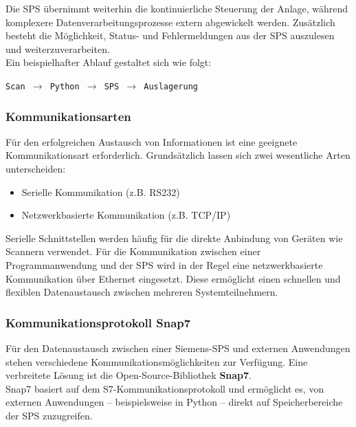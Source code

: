 Die SPS übernimmt weiterhin die kontinuierliche Steuerung der Anlage, während komplexere Datenverarbeitungsprozesse extern abgewickelt werden. Zusätzlich besteht die Möglichkeit, Status- und Fehlermeldungen aus der SPS auszulesen und weiterzuverarbeiten.\\

Ein beispielhafter Ablauf gestaltet sich wie folgt:

\begin{center}
	\texttt{Scan $\rightarrow$ Python $\rightarrow$ SPS $\rightarrow$ Auslagerung}
\end{center}

\subsubsection{Kommunikationsarten}

Für den erfolgreichen Austausch von Informationen ist eine geeignete Kommunikationsart erforderlich. Grundsätzlich lassen sich zwei wesentliche Arten unterscheiden:

\begin{itemize}
	\item Serielle Kommunikation (z.B. RS232)
	\item Netzwerkbasierte Kommunikation (z.B. TCP/IP)
\end{itemize}

Serielle Schnittstellen werden häufig für die direkte Anbindung von Geräten wie Scannern verwendet. Für die Kommunikation zwischen einer Programmanwendung und der SPS wird in der Regel eine netzwerkbasierte Kommunikation über Ethernet eingesetzt. Diese ermöglicht einen schnellen und flexiblen Datenaustausch zwischen mehreren Systemteilnehmern\cite{TCP}.

\subsubsection{Kommunikationsprotokoll Snap7}

Für den Datenaustausch zwischen einer Siemens-SPS und externen Anwendungen stehen verschiedene Kommunikationsmöglichkeiten zur Verfügung. Eine verbreitete Lösung ist die Open-Source-Bibliothek \textbf{Snap7}.\\

Snap7 basiert auf dem S7-Kommunikationsprotokoll und ermöglicht es, von externen Anwendungen – beispielsweise in Python – direkt auf Speicherbereiche der SPS zuzugreifen\cite{snap7}.\\

